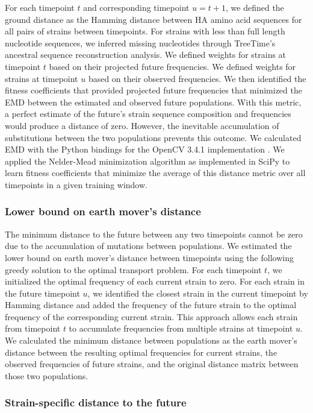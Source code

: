 For each timepoint $t$ and corresponding timepoint $u = t + 1$, we defined the ground distance as the Hamming distance between HA amino acid sequences for all pairs of strains between timepoints.
For strains with less than full length nucleotide sequences, we inferred missing nucleotides through TreeTime's ancestral sequence reconstruction analysis.
We defined weights for strains at timepoint $t$ based on their projected future frequencies.
We defined weights for strains at timepoint $u$ based on their observed frequencies.
We then identified the fitness coefficients that provided projected future frequencies that minimized the EMD between the estimated and observed future populations.
With this metric, a perfect estimate of the future's strain sequence composition and frequencies would produce a distance of zero.
However, the inevitable accumulation of substitutions between the two populations prevents this outcome.
We calculated EMD with the Python bindings for the OpenCV 3.4.1 implementation \citep{opencv_library}.
We applied the Nelder-Mead minimization algorithm as implemented in SciPy \citep{virtanen_scipy_2020} to learn fitness coefficients that minimize the average of this distance metric over all timepoints in a given training window.

\subsubsection*{Lower bound on earth mover's distance}

The minimum distance to the future between any two timepoints cannot be zero due to the accumulation of mutations between populations.
We estimated the lower bound on earth mover's distance between timepoints using the following greedy solution to the optimal transport problem.
For each timepoint $t$, we initialized the optimal frequency of each current strain to zero.
For each strain in the future timepoint $u$, we identified the closest strain in the current timepoint by Hamming distance and added the frequency of the future strain to the optimal frequency of the corresponding current strain.
This approach allows each strain from timepoint $t$ to accumulate frequencies from multiple strains at timepoint $u$.
We calculated the minimum distance between populations as the earth mover's distance between the resulting optimal frequencies for current strains, the observed frequencies of future strains, and the original distance matrix between those two populations.

\subsubsection*{Strain-specific distance to the future}

